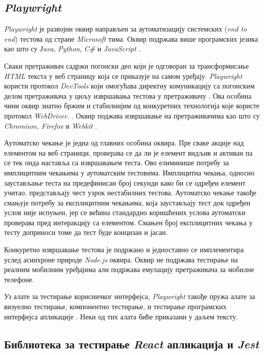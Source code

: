\documentclass[12pt,oneside]{memoir}
\begin{document}
\subsection{\textit{Playwright}}

\textit{Playwright} је развојни оквир направљен за аутоматизацију системских (\textit{end to end}) тестова од стране \textit{Microsoft} тима. Оквир подржава више програмских језика као што су \textit{Јava}, \textit{Python}, \textit{C\#}  и \textit{JavaScript} \cite{playwright}.

Сваки претраживач садржи погонски део који је одговоран за трансформисање \textit{HTML} текста у веб страницу која се приказује на самом уређају. \textit{Playwright} користи протокол \textit{DevTools} који омогућава директну комуникацију са погонским делом претраживача у циљу извршавања тестова у претраживачу \cite{playwrightTutorial}. Ова особина чини оквир знатно бржим и стабилнијим од конкуретних технологија које користе протокол \textit{WebDriver}. \cite{playwrightVsSelenium,speedTest}. Оквир поджава извршавање на претраживачима као што су \textit{Chromium,  Firefox} и \textit{Webkit} \cite{playwright, chromium,webKit}.

Аутоматско чекање је једна од главних особина оквира. Пре сваке акције над елементом на веб страници, проверава се да ли је елемент видљив и активан па се тек онда наставља са извршавањем теста. Ово елиминише потребу за имплицитним чекањима у аутоматским тестовима. Имплицитна чекања, односно заустављање теста на предефинисан број секунди како би се одређен елемент учитао, представљају чест узрок нестабилних тестова. Аутоматско чекање такође смањује потребу за експлицитним чекањима, која заустављају тест док одређен услов није испуњен, јер се већина стандардно коришћених услова аутоматски проверава пред интеракцију са елементом. Смањен број експлицитних чекања у тесту доприноси томе да тест буде концизан и јасан.

Конкуретно извршавање тестова је подржано и једноставно се имплементира услед асинхроне природе \textit{Node.js} оквира. Оквир не подржава тестирање на реалним мобилним уређајима али подржава емулацију претраживача за мобилне телефоне.

Уз алате за тестирање корисничког интерфејса, \textit{Playwright} такође пружа алате за визуелно тестирање, компонентно тестирање, и тестирање програмских интерфејса апликације \cite{playwright}. Неки од тих алата биће приказани у даљем тексту.

\subsection{Библиотека за тестирање \textit{React} апликација и  \textit{Jest}}
\end{document}
